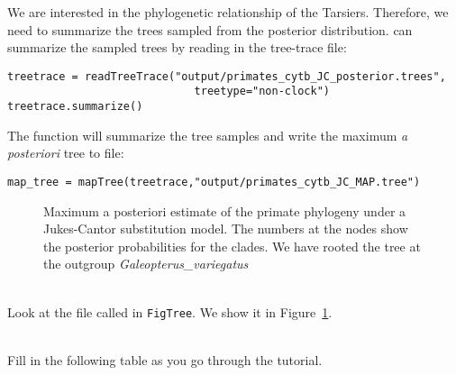 We are interested in the phylogenetic relationship of the Tarsiers. Therefore, we need to summarize the trees sampled from the posterior distribution.
\RevBayes can summarize the sampled trees by reading in the tree-trace file:
{\tt \begin{snugshade*}
\begin{lstlisting}
treetrace = readTreeTrace("output/primates_cytb_JC_posterior.trees",
                             treetype="non-clock")
treetrace.summarize()
\end{lstlisting}
\end{snugshade*}}
The  function will summarize the tree samples and write the maximum \textit{a posteriori} tree to file:
{\tt \begin{snugshade*}
\begin{lstlisting}
map_tree = mapTree(treetrace,"output/primates_cytb_JC_MAP.tree")
\end{lstlisting}
\end{snugshade*}}
\begin{figure}[htbp!]
\centering
{}
\caption{\small Maximum a posteriori estimate of the primate phylogeny under a Jukes-Cantor substitution model. 
The numbers at the nodes show the posterior probabilities for the clades.
We have rooted the tree at the outgroup \emph{Galeopterus\_variegatus}}
\label{fig:jc_tree}
\end{figure}
\noindent \\ \impmark Look at the file called  in \texttt{FigTree}. We show it in Figure~\ref{fig:jc_tree}.


\noindent \\ \impmark Fill in the following table as you go through the tutorial.

